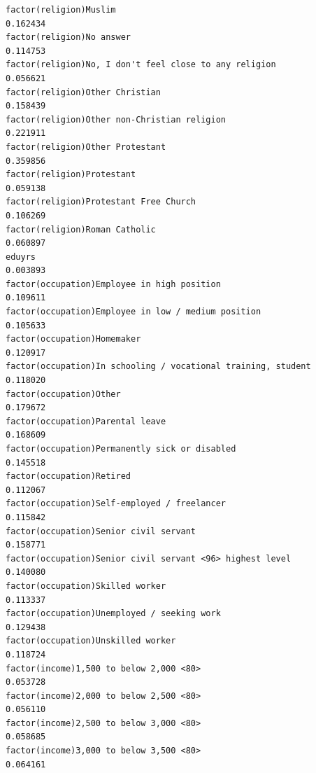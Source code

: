 \documentclass[
]{article}
\begin{document}
\begin{table}
\begin{minipage}[t]{\linewidth}
{\begin{verbatim}
factor(religion)Muslim                                                              0.162434
factor(religion)No answer                                                           0.114753
factor(religion)No, I don't feel close to any religion                              0.056621
factor(religion)Other Christian                                                     0.158439
factor(religion)Other non-Christian religion                                        0.221911
factor(religion)Other Protestant                                                    0.359856
factor(religion)Protestant                                                          0.059138
factor(religion)Protestant Free Church                                              0.106269
factor(religion)Roman Catholic                                                      0.060897
eduyrs                                                                              0.003893
factor(occupation)Employee in high position                                         0.109611
factor(occupation)Employee in low / medium position                                 0.105633
factor(occupation)Homemaker                                                         0.120917
factor(occupation)In schooling / vocational training, student                       0.118020
factor(occupation)Other                                                             0.179672
factor(occupation)Parental leave                                                    0.168609
factor(occupation)Permanently sick or disabled                                      0.145518
factor(occupation)Retired                                                           0.112067
factor(occupation)Self-employed / freelancer                                        0.115842
factor(occupation)Senior civil servant                                              0.158771
factor(occupation)Senior civil servant <96> highest level                           0.140080
factor(occupation)Skilled worker                                                    0.113337
factor(occupation)Unemployed / seeking work                                         0.129438
factor(occupation)Unskilled worker                                                  0.118724
factor(income)1,500 to below 2,000 <80>                                             0.053728
factor(income)2,000 to below 2,500 <80>                                             0.056110
factor(income)2,500 to below 3,000 <80>                                             0.058685
factor(income)3,000 to below 3,500 <80>                                             0.064161

\end{verbatim}}
\end{minipage}
\end{table}
\end{document}
